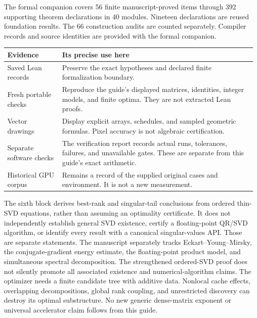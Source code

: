 The formal companion covers 56 finite manuscript-proved items through 392 supporting theorem declarations in 40 modules. Nineteen declarations are reused foundation results. The 66 construction audits are counted separately. Compiler records and source identities are provided with the formal companion.

\begin{tabularx}{\linewidth}{@{}p{.25\linewidth}Y@{}}\toprule
Evidence & Its precise use here \\\midrule
Saved Lean records & Preserve the exact hypotheses and declared finite formalization boundary.\\
Fresh portable checks & Reproduce the guide's displayed matrices, identities, integer models, and finite optima. They are not extracted Lean proofs.\\
Vector drawings & Display explicit arrays, schedules, and sampled geometric formulas. Pixel accuracy is not algebraic certification.\\
Separate software checks & The verification report records actual runs, tolerances, failures, and unavailable gates. These are separate from this guide's exact arithmetic.\\
Historical GPU corpus & Remains a record of the supplied original cases and environment. It is not a new measurement.\\\bottomrule
\end{tabularx}
The sixth block derives best-rank and singular-tail conclusions from ordered thin-SVD equations, rather than assuming an optimality certificate. It does not independently establish general SVD existence, certify a floating-point QR/SVD algorithm, or identify every result with a canonical singular-values API. Those are separate statements.
The manuscript separately tracks Eckart--Young--Mirsky, the conjugate-gradient energy estimate, the floating-point product model, and simultaneous spectral decomposition. The strengthened ordered-SVD proof does not silently promote all associated existence and numerical-algorithm claims.
The optimizer needs a finite candidate tree with additive data. Nonlocal cache effects, overlapping decompositions, global rank coupling, and unrestricted discovery can destroy its optimal substructure. No new generic dense-matrix exponent or universal accelerator claim follows from this guide.
